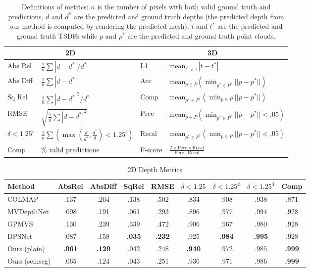 \documentclass[runningheads]{llncs}
\begin{document}
\begin{table}[]
\centering
\caption{Definitions of metrics: $n$ is the number of pixels with both valid ground truth and predictions, $d$ and $d^*$ are the predicted and ground truth depths (the predicted depth from our method is computed by rendering the predicted mesh). $t$ and $t^*$ are the predicted and ground truth TSDFs while $p$ and $p^*$ are the predicted and ground truth point clouds.
}
\begin{tabular}{llll}
\hline
\multicolumn{2}{c}{2D} & \multicolumn{2}{c}{3D} \\
\hline
Abs Rel  & $\frac{1}{n}\sum{|d-d^*|/d^*}$ & L1 & $\mbox{mean}_{t^*<1}{|t-t^*|}$\\
Abs Diff & $\frac{1}{n}\sum{|d-d^*|}$ & Acc & $\mbox{mean}_{p \in P}(\min_{p^*\in P^*}||p-p^*||)$ \\
Sq Rel   & $\frac{1}{n}\sum{|d-d^*|^2/d^*}$ & Comp & $\mbox{mean}_{p^* \in P^*}(\min_{p\in P}||p-p^*||)$ \\
RMSE     & $\sqrt{\frac{1}{n}\sum{|d-d^*|^2}}$ & Prec & $\mbox{mean}_{p \in P}(\min_{p^*\in P^*}||p-p^*||<.05)$ \\
$\delta < 1.25^i$ & $\frac{1}{n}\sum{(\max{(\frac{d}{d^*},\frac{d^*}{d})} < 1.25^i)}$ & Recal & $\mbox{mean}_{p^* \in P^*}(\min_{p\in P}||p-p^*||<.05)$ \\
Comp & $\%$ valid predictions & F-score & $\frac{ 2 \times \text{Perc} \times \text{Recal} }{\text{Perc} + \text{Recal}}$ \\
\hline
\end{tabular}
\label{tab:metric_defs}
\end{table}


\begin{table}[]
\centering
\caption{2D Depth Metrics
}
\begin{tabular}{lcccccccc}
\hline
Method & AbsRel & AbsDiff & SqRel & RMSE & $\delta<1.25$ & $\delta<1.25^2$ & $\delta<1.25^3$ & Comp\\
\hline
COLMAP \cite{schoenberger2016mvs}    & .137 & .264 & .138 & .502 & .834 & .908 & .938 & .871 \\
MVDepthNet \cite{wang2018mvdepthnet} & .098 & .191 & .061 & .293 & .896 & .977 & .994 & .928 \\
GPMVS \cite{hou2019multi}            & .130 & .239 & .339 & .472 & .906 & .967 & .980 & .928 \\
DPSNet \cite{im2019dpsnet}           & .087 & .158 & \textbf{.035} & \textbf{.232} & .925 & \textbf{.984} & \textbf{.995} & .928 \\
\midrule
Ours (plain)                         & \textbf{.061} & \textbf{.120} & .042 & .248 & \textbf{.940} & .972 & .985 &  \textbf{.999} \\
Ours (semseg)                        & .065 & .124 & .043 & .251 & .936 & .971 & .986 & \textbf{.999} \\
\hline

\end{tabular}

\label{tab:results_depth}
\end{table}
\end{document}
